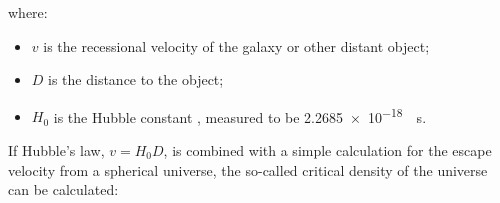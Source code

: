 \documentclass{tufte-handout}
\begin{document}
where:
\begin{itemize}
\item $v$ is the recessional velocity of the galaxy or other distant object;
\item $D$ is the distance to the object;
\item $H_0$ is the Hubble constant , measured to be \SI{2.2685e-18}{\per\second}.
\end{itemize}
If Hubble's law, $v = H_{0}D$, is combined with a simple calculation for the escape velocity from a spherical universe, the so-called critical density of the universe can be calculated:
\end{document}
